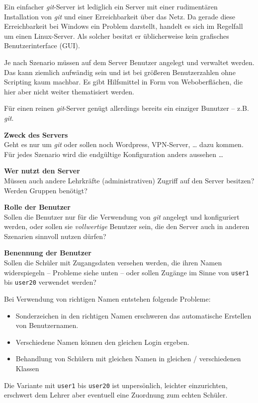 \documentclass[
  letterpaper,
  DIV=11]{scrreprt}
\providecommand{\tightlist}{%
  \setlength{\itemsep}{0pt}\setlength{\parskip}{0pt}}\usepackage{longtable,booktabs,array}
\newcommand{\git}{\textit{git}\xspace}
\newcommand{\gitserver}{\textit{git}-Server\xspace}
\begin{document}
Ein einfacher \git-Server ist lediglich ein Server mit einer
rudimentären Installation von \git und einer Erreichbarkeit über das
Netz. Da gerade diese Erreichbarkeit bei Windows ein Problem darstellt,
handelt es sich im Regelfall um einen Linux-Server. Als solcher besitzt
er üblicherweise kein grafisches Benutzerinterface (GUI).

Je nach Szenario müssen auf dem Server Benutzer angelegt und verwaltet
werden. Das kann ziemlich aufwändig sein und ist bei größeren
Benutzerzahlen ohne Scripting kaum machbar. Es gibt Hilfsmittel in Form
von Weboberflächen, die hier aber nicht weiter thematisiert werden.

Für einen reinen \gitserver genügt allerdings bereits ein einziger
Bunutzer -- z.B. \git.

\textbf{Zweck des Servers}\\
Geht es nur um \git oder sollen noch Wordpress, VPN-Server, \ldots{}
dazu kommen. Für jedes Szenario wird die endgültige Konfiguration anders
aussehen \ldots{}

\textbf{Wer nutzt den Server}\\
Müssen auch andere Lehrkräfte (administrativen) Zugriff auf den Server
besitzen? Werden Gruppen benötigt?

\textbf{Rolle der Benutzer}\\
Sollen die Benutzer nur für die Verwendung von \git angelegt und
konfiguriert werden, oder sollen sie \emph{vollwertige} Benutzer sein,
die den Server auch in anderen Szenarien sinnvoll nutzen dürfen?

\textbf{Benennung der Benutzer}\\
Sollen die Schüler mit Zugangsdaten versehen werden, die ihren Namen
widerspiegeln -- Probleme siehe unten -- oder sollen Zugänge im Sinne
von \texttt{user1} bis \texttt{user20} verwendet werden?

Bei Verwendung von richtigen Namen entstehen folgende Probleme:

\begin{itemize}
\tightlist
\item
  Sonderzeichen in den richtigen Namen erschweren das automatische
  Erstellen von Benutzernamen.
\item
  Verschiedene Namen können den gleichen Login ergeben.
\item
  Behandlung von Schülern mit gleichen Namen in gleichen / verschiedenen
  Klassen
\end{itemize}

Die Variante mit \texttt{user1} bis \texttt{user20} ist unpersönlich,
leichter einzurichten, erschwert dem Lehrer aber eventuell eine
Zuordnung zum echten Schüler.
\end{document}
